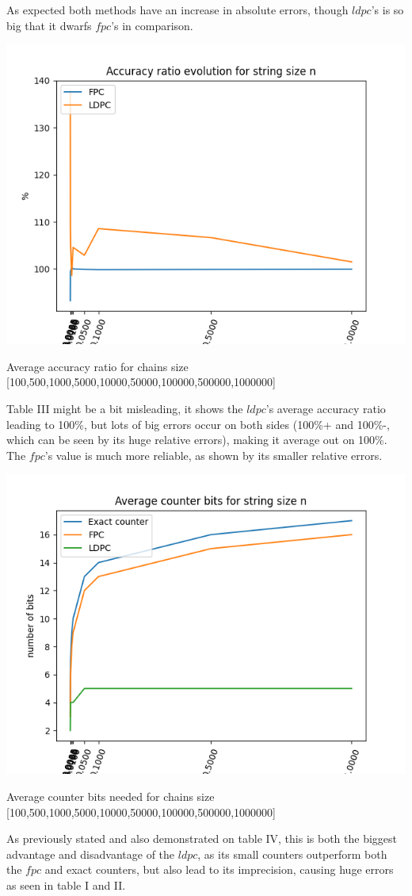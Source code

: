 \documentclass[...]{revdetua}
\begin{document}
As expected both methods have an increase in absolute errors, though $ldpc$'s is so big that it dwarfs $fpc$'s in comparison.
\begin{table}[h]
\includegraphics[scale=0.5]{accuracy_ratio_big.png}
\caption{Average accuracy ratio for chains size [100,500,1000,5000,10000,50000,100000,500000,1000000]}
\end{table}
Table III might be a bit misleading, it shows the $ldpc$'s average accuracy ratio leading to 100\%, but lots of big errors occur on both sides (100\%+ and 100\%-, which can be seen by its huge relative errors), making it average out on 100\%. The $fpc$'s value is much more reliable, as shown by its smaller relative errors.
\begin{table}[h]
\includegraphics[scale=0.5]{average_counter_bits_big.png}
\caption{Average counter bits needed for chains size [100,500,1000,5000,10000,50000,100000,500000,1000000]}
\end{table}
As previously stated and also demonstrated on table IV, this is both the biggest advantage and disadvantage of the $ldpc$, as its small counters outperform both the $fpc$ and exact counters, but also lead to its imprecision, causing huge errors  as seen in  table I and II.
\end{document}
